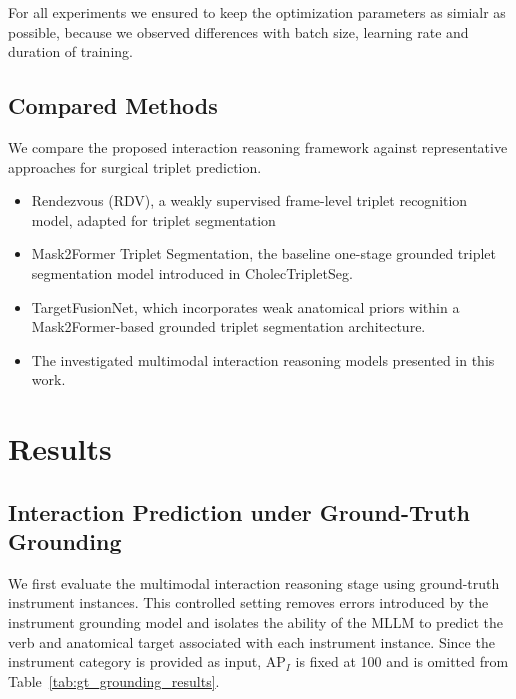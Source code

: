 \documentclass[11pt]{article}
\begin{document}
For all experiments we ensured to keep the optimization parameters as simialr as possible, because we observed differences with batch size, learning rate and duration of training. 

\subsection{Compared Methods}
We compare the proposed interaction reasoning framework against representative approaches for surgical triplet prediction.

\begin{itemize}
\item Rendezvous (RDV), a weakly supervised frame-level triplet recognition model, adapted for triplet segmentation

\item Mask2Former Triplet Segmentation, the baseline one-stage grounded triplet segmentation model introduced in CholecTripletSeg.

\item TargetFusionNet, which incorporates weak anatomical priors within a Mask2Former-based grounded triplet segmentation architecture.

\item The investigated multimodal interaction reasoning models presented in this work.
\end{itemize}

\section{Results}
\subsection{Interaction Prediction under Ground-Truth Grounding}
We first evaluate the multimodal interaction reasoning stage using ground-truth instrument instances. This controlled setting removes errors introduced by the instrument grounding model and isolates the ability of the MLLM to predict the verb and anatomical target associated with each instrument instance. Since the instrument category is provided as input, AP$_I$ is fixed at 100 and is omitted
from Table~\ref{tab:gt_grounding_results}.
\end{document}

